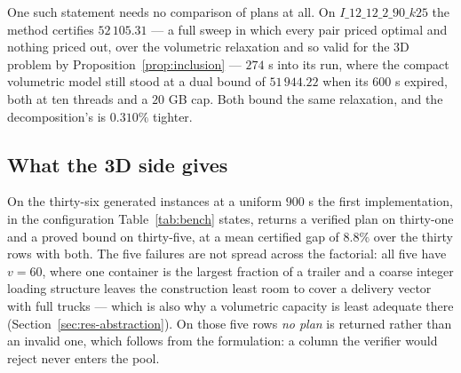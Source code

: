 One such statement needs no comparison of plans at all. On
$I\_12\_12\_2\_90\_k25$ the method certifies $52\,105.31$ --- a
full sweep in which every pair priced optimal and nothing priced out,
over the volumetric relaxation and so valid for the 3D problem by
Proposition~\ref{prop:inclusion} --- $274$ s into its run, where the
compact volumetric model still stood at a dual bound of $51\,944.22$
when its $600$ s expired, both at ten threads and a $20$ GB cap. Both
bound the same relaxation, and the decomposition's is $0.310\%$
tighter.

\subsection{What the 3D side gives}
\label{sec:res-3d}







On the thirty-six generated instances at a uniform $900$ s the first
implementation, in the configuration Table~\ref{tab:bench} states,
returns a verified plan on thirty-one and a proved bound on
thirty-five, at a mean certified gap of $8.8\%$ over the thirty rows
with both. The five failures are not spread across the factorial:
all five have $v=60$, where one container is the largest fraction of a
trailer and a coarse integer loading structure leaves the construction
least room to cover a delivery vector with full trucks --- which is
also why a volumetric capacity is least adequate there
(Section~\ref{sec:res-abstraction}). On those five rows
\emph{no plan} is returned rather than an invalid one, which follows
from the formulation: a column the verifier would reject never enters
the pool.

